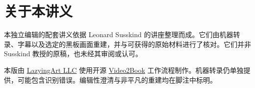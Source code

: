 \documentclass[11pt,oneside]{book}
\begin{document}
\frontmatter
\hypersetup{pageanchor=false}

\hypersetup{pageanchor=true}

\clearpage
\chapter*{关于本讲义}
本独立编辑的配套讲义依据 Leonard Susskind 的讲座整理而成。它们由机器转录、字幕以及选定的黑板画面重建，并与可获得的原始材料进行了核对。它们并非 Susskind 教授的原稿，也未经其审阅或认可。

本版由 \href{https://lazying.art}{LazyingArt LLC} 使用开源 \href{https://github.com/lachlanchen/Video2Book}{Video2Book} 工作流程制作。机器转录仍单独提供，可能包含识别错误。编辑性澄清与非平凡的重建均在脚注中标明。
\clearpage
\tableofcontents
\mainmatter










\end{document}
